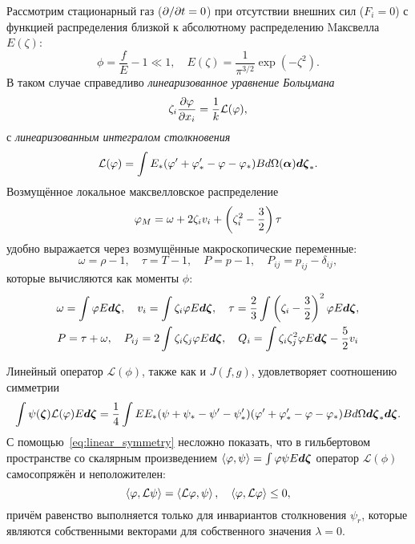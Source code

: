 Рассмотрим стационарный газ (\(\Pder{t}=0\)) при отсутствии внешних сил (\(F_i=0\))
с функцией распределения близкой к абсолютному распределению Mаксвелла \(E(\zeta)\):
\begin{equation}\label{eq:linear_condition}
    \phi = \frac{f}{E} - 1 \ll 1, \quad E(\zeta) = \frac1{\pi^{3/2}}\exp\left(-\zeta^2\right).
\end{equation}
В таком случае справедливо \emph{линеаризованное уравнение Больцмана}
\begin{equation}\label{eq:linear_Boltzmann}
    \zeta_i \pder[\phi]{x_i} = \frac1k \mathcal{L}(\phi),
\end{equation}
с \emph{линеаризованным интегралом столкновения}
\begin{equation}\label{eq:linear_ci}
    \mathcal{L}(\phi) = \int E_*(\phi'+\phi'_*-\phi-\phi_*) B
    \dd \Omega(\boldsymbol{\alpha}) \dzeta_*.
\end{equation}
Возмущённое локальное максвелловское распределение
\begin{equation}\label{eq:linear_maxwellian}
    \phi_M = \omega + 2\Z v_i + \left(\Z^2-\frac32\right)\tau
\end{equation}
удобно выражается через возмущённые макроскопические переменные:
\begin{equation}\label{eq:linear_macro}
    \omega = \rho-1, \quad \tau = T-1, \quad P = p-1, \quad P_{ij} = p_{ij} - \delta_{ij},
\end{equation}
которые вычисляются как моменты \(\phi\):
\begin{gather}\label{eq:linear_macro_variables}
    \begin{gathered}
        \omega = \int \phi E\dzeta, \quad
        v_i = \int \Z \phi E\dzeta, \quad
        \tau = \frac23 \int \left( \Z-\frac32 \right)^2 \phi E\dzeta, \\
        P = \tau + \omega, \quad
        P_{ij} = 2\int \ZZ \phi E\dzeta, \quad
        Q_i = \int \ZZ^2 \phi E\dzeta - \frac52v_i
    \end{gathered}
\end{gather}

Линейный оператор \(\mathcal{L}(\phi)\), также как и \(J(f,g)\), удовлетворяет соотношению симметрии
\begin{equation}\label{eq:linear_symmetry}
    \int\psi(\bzeta)\mathcal{L}(\phi)E\dzeta = \frac14\int EE_* (\psi+\psi_*-\psi'-\psi'_*)
        (\phi'+\phi'_*-\phi-\phi_*) B\dd\Omega\dzeta_*\dzeta.
\end{equation}
С помощью~\eqref{eq:linear_symmetry} несложно показать, что в гильбертовом пространстве
со скалярным произведением \( \inner{\phi}{\psi} = \int\phi\psi E\dzeta\)
оператор \(\mathcal{L}(\phi)\) самосопряжён и неположителен:
\begin{equation}\label{eq:linear_properties}
    \inner{\phi}{\mathcal{L}\psi} = \inner{\mathcal{L}\phi}{\psi}, \quad
    \inner{\phi}{\mathcal{L}\phi} \leq 0,
\end{equation}
причём равенство выполняется только для инвариантов столкновения \(\psi_r\),
которые являются собственными векторами для собственного значения \(\lambda = 0\).

